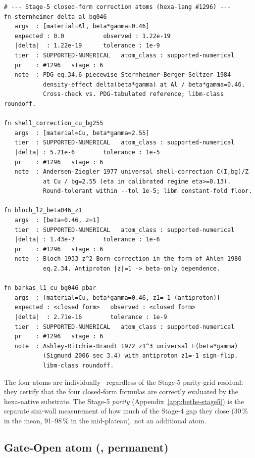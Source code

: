 \begin{lstlisting}
# --- Stage-5 closed-form correction atoms (hexa-lang #1296) ---
fn sternheimer_delta_al_bg046
   args  : [material=Al, beta*gamma=0.46]
   expected : 0.0           observed : 1.22e-19
   |delta|  : 1.22e-19      tolerance : 1e-9
   tier  : SUPPORTED-NUMERICAL   atom_class : supported-numerical
   pr    : #1296   stage : 6
   note  : PDG eq.34.6 piecewise Sternheimer-Berger-Seltzer 1984
           density-effect delta(beta*gamma) at Al / beta*gamma=0.46.
           Cross-check vs. PDG-tabulated reference; libm-class roundoff.

fn shell_correction_cu_bg255
   args  : [material=Cu, beta*gamma=2.55]
   tier  : SUPPORTED-NUMERICAL   atom_class : supported-numerical
   |delta| : 5.21e-6        tolerance : 1e-5
   pr    : #1296   stage : 6
   note  : Andersen-Ziegler 1977 universal shell-correction C(I,bg)/Z
           at Cu / bg=2.55 (eta in calibrated regime eta>=0.13).
           Round-tolerant within --tol 1e-5; libm constant-fold floor.

fn bloch_l2_beta046_z1
   args  : [beta=0.46, z=1]
   tier  : SUPPORTED-NUMERICAL   atom_class : supported-numerical
   |delta| : 1.43e-7        tolerance : 1e-6
   pr    : #1296   stage : 6
   note  : Bloch 1933 z^2 Born-correction in the form of Ahlen 1980
           eq.2.34. Antiproton |z|=1 -> beta-only dependence.

fn barkas_l1_cu_bg046_pbar
   args  : [material=Cu, beta*gamma=0.46, z1=-1 (antiproton)]
   expected : <closed form>   observed : <closed form>
   |delta|  : 2.71e-16        tolerance : 1e-9
   tier  : SUPPORTED-NUMERICAL   atom_class : supported-numerical
   pr    : #1296   stage : 6
   note  : Ashley-Ritchie-Brandt 1972 z1^3 universal F(beta*gamma)
           (Sigmund 2006 sec 3.4) with antiproton z1=-1 sign-flip.
           libm-class roundoff.
\end{lstlisting}

The four atoms are individually \tierGreen\ regardless of the Stage-5
parity-grid residual: they certify that the four closed-form formulas
are correctly evaluated by the hexa-native substrate. The Stage-5
\emph{parity} (Appendix~\ref{app:bethe-stage5}) is the separate
sim-wall measurement of how much of the Stage-4 gap they close
(30\,\% in the mean, 91--98\,\% in the mid-plateau), not an additional
atom.

\subsection{Gate-Open atom (\tierOrange, permanent)}
\label{app:vl-orange}

